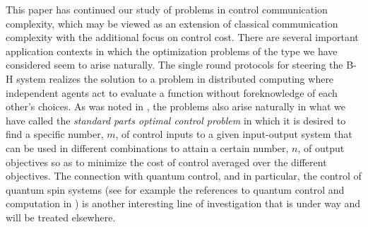 \documentclass[12pt,onecolumn,draftcls]{IEEEtran}
\begin{document}
This paper has continued our study of problems in control communication complexity, which may be viewed as an extension of classical communication complexity with the additional focus on control cost.  There are several important application contexts in which the optimization problems of the type we have considered seem to arise naturally.  The single round protocols for steering the B-H system realizes the solution to a problem in distributed computing where independent agents act to evaluate a function without foreknowledge of each other's choices.  As was noted in \cite{CDC09}, the problems also arise naturally in what we have called the {\em standard parts optimal control problem} in which it is desired to find a specific number, $m$, of control inputs to a given input-output system that can be used in different combinations to attain a certain number, $n$, of output objectives so as to minimize the cost of control averaged over the different objectives. 
The connection with quantum control, and in particular, the control of quantum spin systems (see for example the references to quantum control and computation in \cite{WB}) is another interesting line of investigation that is under way and will be treated elsewhere.
\end{document}
